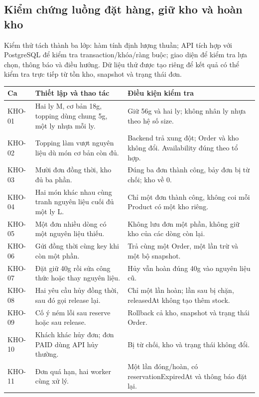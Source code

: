 \subsection{Kiểm chứng luồng đặt hàng, giữ kho và hoàn kho}
\label{sec:inventory-tests}
Kiểm thử tách thành ba lớp: hàm tính định lượng thuần; API tích hợp với PostgreSQL để kiểm tra transaction/khóa/ràng buộc; giao diện để kiểm tra lựa chọn, thông báo và điều hướng. Dữ liệu thử được tạo riêng để kết quả có thể kiểm tra trực tiếp từ tồn kho, snapshot và trạng thái đơn.

\begingroup\small
\begin{longtable}{|p{.10\linewidth}|p{.43\linewidth}|p{.36\linewidth}|}
\hline\textbf{Ca} & \textbf{Thiết lập và thao tác} & \textbf{Điều kiện kiểm tra}\\\hline\endhead
KHO-01 & Hai ly M, cơ bản 18g, topping dùng chung 5g, một ly nhựa mỗi ly. & Giữ 56g và hai ly; không nhân ly nhựa theo hệ số size.\\\hline
KHO-02 & Topping làm vượt nguyên liệu dù món cơ bản còn đủ. & Backend trả xung đột; Order và kho không đổi. Availability đúng theo tổ hợp.\\\hline
KHO-03 & Mười đơn đồng thời, kho đủ ba phần. & Đúng ba đơn thành công, bảy đơn bị từ chối; kho về 0.\\\hline
KHO-04 & Hai món khác nhau cùng tranh nguyên liệu cuối đủ một ly L. & Chỉ một đơn thành công, không coi mỗi Product có một kho riêng.\\\hline
KHO-05 & Một đơn nhiều dòng có một nguyên liệu thiếu. & Không lưu đơn một phần, không giữ kho của các dòng còn lại.\\\hline
KHO-06 & Gửi đồng thời cùng key khi còn một phần. & Trả cùng một Order, một lần trừ và một bộ snapshot.\\\hline
KHO-07 & Đặt giữ 40g rồi sửa công thức hoặc thay nguyên liệu. & Hủy vẫn hoàn đúng 40g vào nguyên liệu cũ.\\\hline
KHO-08 & Hai yêu cầu hủy đồng thời, sau đó gọi release lại. & Chỉ một lần hoàn; lần sau bị chặn, releasedAt không tạo thêm stock.\\\hline
KHO-09 & Cố ý ném lỗi sau reserve hoặc sau release. & Rollback cả kho, snapshot và trạng thái Order.\\\hline
KHO-10 & Khách khác hủy đơn; đơn PAID dùng API hủy thường. & Bị từ chối, kho và trạng thái không đổi.\\\hline
KHO-11 & Đơn quá hạn, hai worker cùng xử lý. & Một lần đóng/hoàn, có reservationExpiredAt và thông báo đặt lại.\\\hline

\end{longtable}
